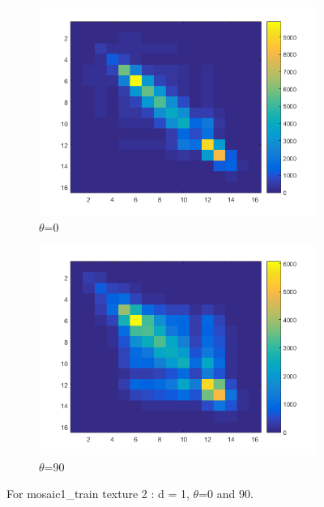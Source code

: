 \documentclass[a4paper, article, oneside, UKenglish]{memoir}
\newcommand{\0}{\mathbf{0}}
\newcommand{\1}{\mathbf{1}}
\begin{document}
\begin{figure}
  \centering
  \begin{subfigure}[b]{0.45\linewidth}
    \includegraphics[width=\linewidth]{./images/tx2-0.png}
    \caption{$\theta$=0}
  \end{subfigure}
  \begin{subfigure}[b]{0.45\linewidth}
    \includegraphics[width=\linewidth]{./images/tx2-90.png}
    \caption{$\theta$=90}
  \end{subfigure}
  \caption{For mosaic1\_train texture 2 : d = 1, $\theta$=0 and 90.}
  \label{fig:t2glcm}
\end{figure}
\end{document}
